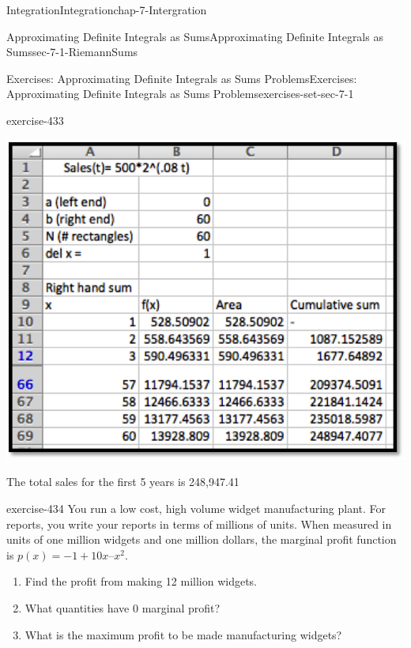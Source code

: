 \documentclass[oneside,10pt,]{book}
\numberwithin{equation}{section}
\begin{document}
\begin{chapterptx}{Integration}{}{Integration}{}{}{chap-7-Intergration}
\begin{sectionptx}{Approximating Definite Integrals as Sums}{}{Approximating Definite Integrals as Sums}{}{}{sec-7-1-RiemannSums}
\begin{exercises-subsection-numberless}{Exercises: Approximating Definite Integrals as Sums Problems}{}{Exercises: Approximating Definite Integrals as Sums Problems}{}{}{exercises-set-sec-7-1}
\begin{divisionexercise}{11}{}{}{exercise-433}
\begin{enumerate}[label=(\alph*)]
\begin{sidebyside}{1}{0.15}{0.15}{0}
\begin{sbspanel}{0.7}
\includegraphics[width=1\linewidth]{images/sec7-1-sol11d.png}
\end{sbspanel}%
\end{sidebyside}%
\par
\hypertarget{p-2614}{}%
The total sales for the first 5 years is \textdollar{}248,947.41%
\end{enumerate}
\end{divisionexercise}%
\begin{divisionexercise}{12}{}{}{exercise-434}%
\hypertarget{p-2615}{}%
You run a low cost, high volume widget manufacturing plant.  For reports, you write your reports in terms of millions of units.  When measured in units of one million widgets and one million dollars, the marginal profit function is \(p(x) = -1 + 10 x – x^2\).%
\leavevmode%
\begin{enumerate}[label=(\alph*)]
\item\hypertarget{li-707}{}\hypertarget{p-2616}{}%
Find the profit from making 12 million widgets.%
\item\hypertarget{li-708}{}\hypertarget{p-2617}{}%
What quantities have 0 marginal profit?%
\item\hypertarget{li-709}{}\hypertarget{p-2618}{}%
What is the maximum profit to be made manufacturing widgets?%
\end{enumerate}
\end{divisionexercise}%
\end{exercises-subsection-numberless}
\end{sectionptx}
%
%
\typeout{************************************************}

\end{chapterptx}
\end{document}
